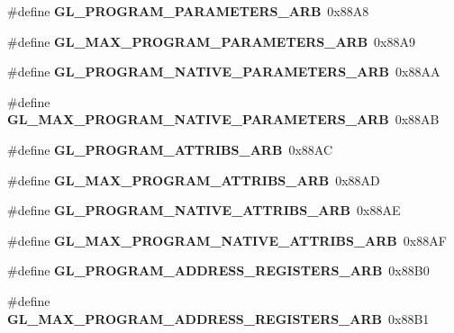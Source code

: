 \begin{DoxyCompactItemize}
\item 
\#define {\bfseries G\+L\+\_\+\+P\+R\+O\+G\+R\+A\+M\+\_\+\+P\+A\+R\+A\+M\+E\+T\+E\+R\+S\+\_\+\+A\+R\+B}~0x88\+A8\label{_s_d_l__opengl_8h_ad6c7d73a586bb05a738cf39759217e81}

\item 
\#define {\bfseries G\+L\+\_\+\+M\+A\+X\+\_\+\+P\+R\+O\+G\+R\+A\+M\+\_\+\+P\+A\+R\+A\+M\+E\+T\+E\+R\+S\+\_\+\+A\+R\+B}~0x88\+A9\label{_s_d_l__opengl_8h_ae9fe65e3170515ee05754f337ddfe646}

\item 
\#define {\bfseries G\+L\+\_\+\+P\+R\+O\+G\+R\+A\+M\+\_\+\+N\+A\+T\+I\+V\+E\+\_\+\+P\+A\+R\+A\+M\+E\+T\+E\+R\+S\+\_\+\+A\+R\+B}~0x88\+A\+A\label{_s_d_l__opengl_8h_a230fe8d69cf4a541a80bae440a42a427}

\item 
\#define {\bfseries G\+L\+\_\+\+M\+A\+X\+\_\+\+P\+R\+O\+G\+R\+A\+M\+\_\+\+N\+A\+T\+I\+V\+E\+\_\+\+P\+A\+R\+A\+M\+E\+T\+E\+R\+S\+\_\+\+A\+R\+B}~0x88\+A\+B\label{_s_d_l__opengl_8h_adfec1172793bfa533edb803f498aeba4}

\item 
\#define {\bfseries G\+L\+\_\+\+P\+R\+O\+G\+R\+A\+M\+\_\+\+A\+T\+T\+R\+I\+B\+S\+\_\+\+A\+R\+B}~0x88\+A\+C\label{_s_d_l__opengl_8h_afa18236581a25d5c5c1de0da5c3d6f96}

\item 
\#define {\bfseries G\+L\+\_\+\+M\+A\+X\+\_\+\+P\+R\+O\+G\+R\+A\+M\+\_\+\+A\+T\+T\+R\+I\+B\+S\+\_\+\+A\+R\+B}~0x88\+A\+D\label{_s_d_l__opengl_8h_ac125882d6bff243eb94eab54371683e6}

\item 
\#define {\bfseries G\+L\+\_\+\+P\+R\+O\+G\+R\+A\+M\+\_\+\+N\+A\+T\+I\+V\+E\+\_\+\+A\+T\+T\+R\+I\+B\+S\+\_\+\+A\+R\+B}~0x88\+A\+E\label{_s_d_l__opengl_8h_a84ff4c23d774c5c653ac025d4c676c08}

\item 
\#define {\bfseries G\+L\+\_\+\+M\+A\+X\+\_\+\+P\+R\+O\+G\+R\+A\+M\+\_\+\+N\+A\+T\+I\+V\+E\+\_\+\+A\+T\+T\+R\+I\+B\+S\+\_\+\+A\+R\+B}~0x88\+A\+F\label{_s_d_l__opengl_8h_ab0a254a201c69c194966a6c42113a32f}

\item 
\#define {\bfseries G\+L\+\_\+\+P\+R\+O\+G\+R\+A\+M\+\_\+\+A\+D\+D\+R\+E\+S\+S\+\_\+\+R\+E\+G\+I\+S\+T\+E\+R\+S\+\_\+\+A\+R\+B}~0x88\+B0\label{_s_d_l__opengl_8h_a27d35362f5f6c5ac2acd04776326fa8a}

\item 
\#define {\bfseries G\+L\+\_\+\+M\+A\+X\+\_\+\+P\+R\+O\+G\+R\+A\+M\+\_\+\+A\+D\+D\+R\+E\+S\+S\+\_\+\+R\+E\+G\+I\+S\+T\+E\+R\+S\+\_\+\+A\+R\+B}~0x88\+B1\label{_s_d_l__opengl_8h_a839104d7c96607dc6b5c2aa9ba6fd4ef}


\end{DoxyCompactItemize}
